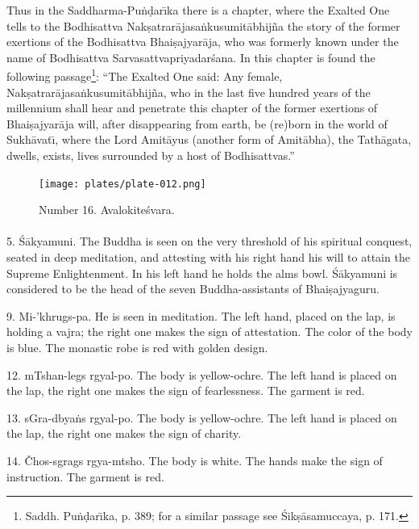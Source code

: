 \documentclass[a4paper, 12pt, oneside]{article}
\begin{document}
Thus in the Saddharma-Pu\.{n}\d{d}ar\={\i}ka there is a chapter, where the Exalted One tells to the Bodhisattva Nak\d{s}atrar\={a}jasa\.{n}kusumit\={a}bhij\~{n}a the story of the former exertions of the Bodhisattva Bhai\d{s}ajyar\={a}ja, who was formerly known under the name of Bodhisattva Sarvasattvapriyadar\'{s}ana. In this chapter is found the following passage\footnote{Saddh. Pu\.{n}\d{d}ar\={\i}ka, p. 389; for a similar passage see \'{S}ik\d{s}\={a}samuccaya, p. 171.}: ``The Exalted One said: Any female, Nak\d{s}atrar\={a}jasa\.{n}kusumit\={a}bhij\~{n}a, who in the last five hundred years of the millennium shall hear and penetrate this chapter of the former exertions of Bhai\d{s}ajyar\={a}ja will, after disappearing from earth, be (re)born in the world of Sukh\={a}vat\={\i}, where the Lord Amit\={a}yus (another form of Amit\={a}bha), the Tath\={a}gata, dwells, exists, lives surrounded by a host of Bodhisattvas.''

\clearpage
\vspace*{\fill}
\begin{figure}[H]
\centering
\texttt{[image: plates/plate-012.png]}
\caption*{Number 16. Avalokite\'{s}vara.}
\end{figure}
\vspace*{\fill}
\clearpage
\paragraph{}
5. \'{S}\={a}kyamuni. The Buddha is seen on the very threshold of his spiritual conquest, seated in deep meditation, and attesting with his right hand his will to attain the Supreme Enlightenment. In his left hand he holds the alms bowl. \'{S}\={a}kyamuni is considered to be the head of the seven Buddha-assistants of Bhai\d{s}ajyaguru.

9. Mi-'khrugs-pa. He is seen in meditation. The left hand, placed on the lap, is holding a vajra; the right one makes the sign of attestation. The color of the body is blue. The monastic robe is red with golden design.

12. mTshan-legs rgyal-po. The body is yellow-ochre. The left hand is placed on the lap, the right one makes the sign of fearlessness. The garment is red.

13. sGra-dbya\.{n}s rgyal-po. The body is yellow-ochre. The left hand is placed on the lap, the right one makes the sign of charity.

14. Čhos-sgrags rgya-mtsho. The body is white. The hands make the sign of instruction. The garment is red.
\end{document}
